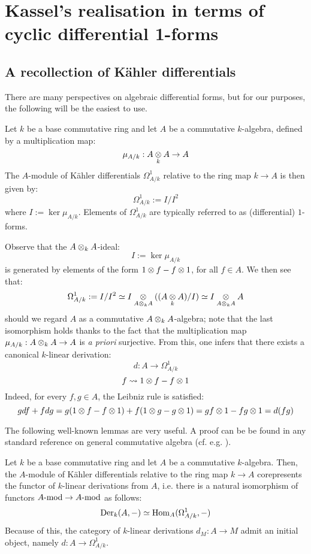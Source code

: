 \section{Kassel's realisation in terms of cyclic differential 1-forms}
    \subsection{A recollection of K\"ahler differentials}
        There are many perspectives on algebraic differential forms, but for our purposes, the following will be the easiest to use.
        \begin{definition} \label{def: kahler_differentials}
            Let $k$ be a base commutative ring and let $A$ be a commutative $k$-algebra, defined by a multiplication map:
                $$\mu_{A/k}: A \tensor_k A \to A$$
            The $A$-module of K\"ahler differentials $\Omega^1_{A/k}$ relative to the ring map $k \to A$ is then given by:
                $$\Omega^1_{A/k} := I/I^2$$
            where $I := \ker \mu_{A/k}$. Elements of $\Omega^1_{A/k}$ are typically referred to as (differential) $1$-forms.
        \end{definition}
        \begin{remark}
            Observe that the $A \tensor_k A$-ideal:
                $$I := \ker \mu_{A/k}$$
            is generated by elements of the form $1 \tensor f - f \tensor 1$, for all $f \in A$. We then see that:
                $$\Omega^1_{A/k} := I/I^2 \cong I \tensor_{A \tensor_k A} ( (A \tensor_k A)/I ) \cong I \tensor_{A \tensor_k A} A$$
            should we regard $A$ as a commutative $A \tensor_k A$-algebra; note that the last isomorphism holds thanks to the fact that the multiplication map $\mu_{A/k}: A \tensor_k A \to A$ is \textit{a priori} surjective. From this, one infers that there exists a canonical $k$-linear derivation:
                $$d: A \to \Omega^1_{A/k}$$
                $$f \mapsto 1 \tensor f - f \tensor 1$$
            Indeed, for every $f, g \in A$, the Leibniz rule is satisfied:
                $$g df + f dg = g(1 \tensor f - f \tensor 1) + f(1 \tensor g - g \tensor 1) = gf \tensor 1 - fg \tensor 1 = d(fg)$$
        \end{remark}
        The following well-known lemmas are very useful. A proof can be be found in any standard reference on general commutative algebra (cf. e.g. \cite[\href{https://stacks.math.columbia.edu/tag/00AO}{Tag 00AO}]{stacks}).
        \begin{lemma}
            Let $k$ be a base commutative ring and let $A$ be a commutative $k$-algebra. Then, the $A$-module of K\"ahler differentials relative to the ring map $k \to A$ corepresents the functor of $k$-linear derivations from $A$, i.e. there is a natural isomorphism of functors $A\mod \to A\mod$ as follows:
                $$\Der_k(A, -) \cong \Hom_A(\Omega^1_{A/k}, -)$$
            Because of this, the category of $k$-linear derivations $d_M: A \to M$ admit an initial object, namely $d: A \to \Omega^1_{A/k}$. 
        \end{lemma}
